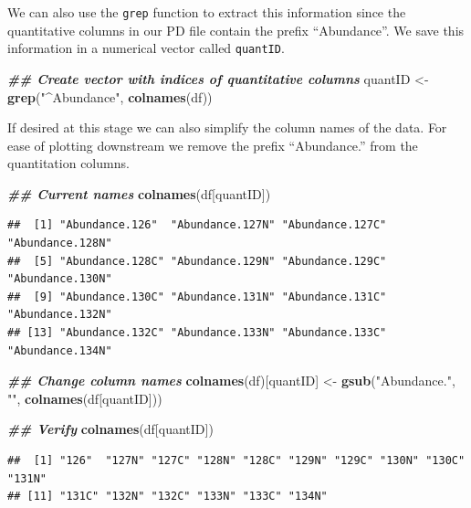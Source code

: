 \documentclass[9pt,a4paper,]{extarticle}
\newenvironment{Shaded}{\begin{snugshade}}{\end{snugshade}}
\newcommand{\DocumentationTok}[1]{\textcolor[rgb]{0.56,0.35,0.01}{\textbf{\textit{#1}}}}
\newcommand{\FunctionTok}[1]{\textcolor[rgb]{0.13,0.29,0.53}{\textbf{#1}}}
\newcommand{\NormalTok}[1]{#1}
\newcommand{\OtherTok}[1]{\textcolor[rgb]{0.56,0.35,0.01}{#1}}
\newcommand{\StringTok}[1]{\textcolor[rgb]{0.31,0.60,0.02}{#1}}
\begin{document}
We can also use the \texttt{grep} function to extract this information since the quantitative
columns in our PD file contain the prefix ``Abundance''. We save this information in a
numerical vector called \texttt{quantID}.

\begin{Shaded}
\begin{Highlighting}[]
\DocumentationTok{\#\# Create vector with indices of quantitative columns}
\NormalTok{quantID }\OtherTok{\textless{}{-}} \FunctionTok{grep}\NormalTok{(}\StringTok{"\^{}Abundance"}\NormalTok{, }\FunctionTok{colnames}\NormalTok{(df))}
\end{Highlighting}
\end{Shaded}

If desired at this stage we can also simplify the column names of the data. For
ease of plotting downstream we remove the prefix ``Abundance.'' from the quantitation
columns.

\begin{Shaded}
\begin{Highlighting}[]
\DocumentationTok{\#\# Current names}
\FunctionTok{colnames}\NormalTok{(df[quantID])}
\end{Highlighting}
\end{Shaded}

\begin{verbatim}
##  [1] "Abundance.126"  "Abundance.127N" "Abundance.127C" "Abundance.128N"
##  [5] "Abundance.128C" "Abundance.129N" "Abundance.129C" "Abundance.130N"
##  [9] "Abundance.130C" "Abundance.131N" "Abundance.131C" "Abundance.132N"
## [13] "Abundance.132C" "Abundance.133N" "Abundance.133C" "Abundance.134N"
\end{verbatim}

\begin{Shaded}
\begin{Highlighting}[]
\DocumentationTok{\#\# Change column names}
\FunctionTok{colnames}\NormalTok{(df)[quantID] }\OtherTok{\textless{}{-}} \FunctionTok{gsub}\NormalTok{(}\StringTok{"Abundance."}\NormalTok{, }\StringTok{""}\NormalTok{, }\FunctionTok{colnames}\NormalTok{(df[quantID]))}

\DocumentationTok{\#\# Verify}
\FunctionTok{colnames}\NormalTok{(df[quantID])}
\end{Highlighting}
\end{Shaded}

\begin{verbatim}
##  [1] "126"  "127N" "127C" "128N" "128C" "129N" "129C" "130N" "130C" "131N"
## [11] "131C" "132N" "132C" "133N" "133C" "134N"
\end{verbatim}
\end{document}
